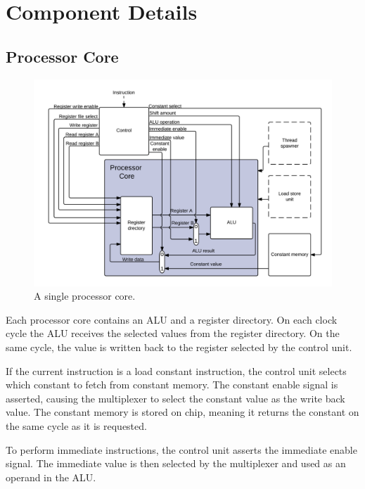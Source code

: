 \documentclass[../main/report.tex]{subfiles}
\begin{document}
\section{Component Details}


\subsection{Processor Core}

\begin{figure}[H]
	\centering
	\includegraphics[width=1.2\textwidth]{../gpu/diagrams/processor_core.png}
	\caption{A single processor core.}
	\label{fig:processor_core}
\end{figure}

Each processor core contains an ALU and a register directory.
On each clock cycle the ALU receives the selected values from the register directory.
On the same cycle, the value is written back to the register selected by the control unit.

If the current instruction is a load constant instruction, the control unit selects which constant to fetch from constant memory.
The constant enable signal is asserted, causing the multiplexer to select the constant value as the write back value.
The constant memory is stored on chip, meaning it returns the constant on the same cycle as it is requested.

To perform immediate instructions, the control unit asserts the immediate enable signal.
The immediate value is then selected by the multiplexer and used as an operand in the ALU.
\end{document}
